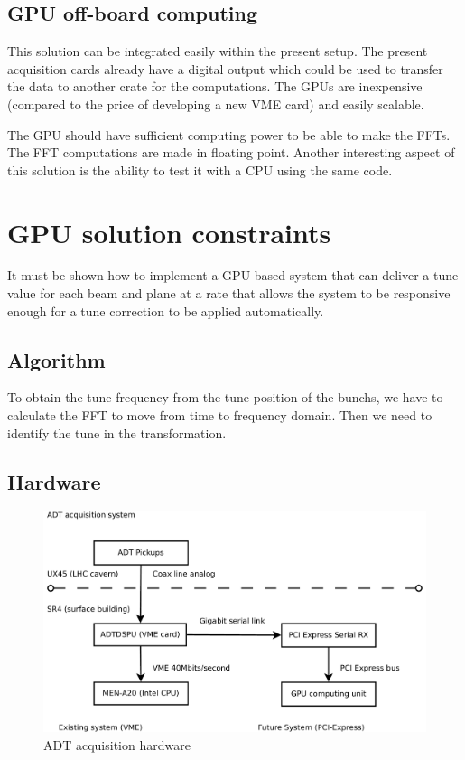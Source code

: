 \subsection{GPU off-board computing}

This solution can be integrated easily within the present setup. The present acquisition cards already have a digital output which could be used to transfer the data to another crate for the computations. The \glspl{GPU} are inexpensive (compared to the price of developing a new \gls{VME} card) and easily scalable. 

The \gls{GPU} should have sufficient computing power to be able to make the \glspl{FFT}. The \gls{FFT} computations are made in floating point. Another interesting aspect of this solution is the ability to test it with a \gls{CPU} using the same code.

\section{GPU solution constraints}

It must be shown how to implement a GPU based system that can deliver a tune value for each beam and plane at a rate that allows the system to be responsive enough for a tune correction to be applied automatically.

\subsection{Algorithm}

To obtain the tune frequency from the tune position of the \glspl{bunch}, we have to calculate the FFT to move from time to frequency domain. Then we need to identify the tune in the transformation.

\subsection{Hardware}

\begin{figure}[H]
\caption{ADT acquisition hardware}
\centering
\includegraphics[scale=0.3]{acquisition.pdf}
\end{figure}

